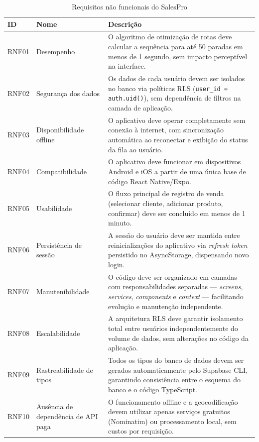 \documentclass[
	12pt,				%
	oneside,			%
	a4paper,			%
	english,			%
	brazil				%
	]{abntex2}
\begin{document}
\begin{table}[htb]
\centering
\footnotesize
\begin{tabular}{|p{1.5cm}|p{3.5cm}|p{7.5cm}|}
  \hline
  \textbf{ID} & \textbf{Nome} & \textbf{Descrição} \\
  \hline
  RNF01 & Desempenho & O algoritmo de otimização de rotas deve calcular a sequência para até 50 paradas em menos de 1 segundo, sem impacto perceptível na interface. \\
  \hline
  RNF02 & Segurança dos dados & Os dados de cada usuário devem ser isolados no banco via políticas RLS (\texttt{user\_id = auth.uid()}), sem dependência de filtros na camada de aplicação. \\
  \hline
  RNF03 & Disponibilidade offline & O aplicativo deve operar completamente sem conexão à internet, com sincronização automática ao reconectar e exibição do status da fila ao usuário. \\
  \hline
  RNF04 & Compatibilidade & O aplicativo deve funcionar em dispositivos Android e iOS a partir de uma única base de código React Native/Expo. \\
  \hline
  RNF05 & Usabilidade & O fluxo principal de registro de venda (selecionar cliente, adicionar produto, confirmar) deve ser concluído em menos de 1 minuto. \\
  \hline
  RNF06 & Persistência de sessão & A sessão do usuário deve ser mantida entre reinicializações do aplicativo via \textit{refresh token} persistido no AsyncStorage, dispensando novo login. \\
  \hline
  RNF07 & Manutenibilidade & O código deve ser organizado em camadas com responsabilidades separadas — \textit{screens}, \textit{services}, \textit{components} e \textit{context} — facilitando evolução e manutenção independente. \\
  \hline
  RNF08 & Escalabilidade & A arquitetura RLS deve garantir isolamento total entre usuários independentemente do volume de dados, sem alterações no código da aplicação. \\
  \hline
  RNF09 & Rastreabilidade de tipos & Todos os tipos do banco de dados devem ser gerados automaticamente pelo Supabase CLI, garantindo consistência entre o esquema do banco e o código TypeScript. \\
  \hline
  RNF10 & Ausência de dependência de API paga & O funcionamento offline e a geocodificação devem utilizar apenas serviços gratuitos (Nominatim) ou processamento local, sem custos por requisição. \\
  \hline
\end{tabular}
\caption{Requisitos não funcionais do SalesPro}
\label{tab:rnf}
\end{table}
\end{document}
